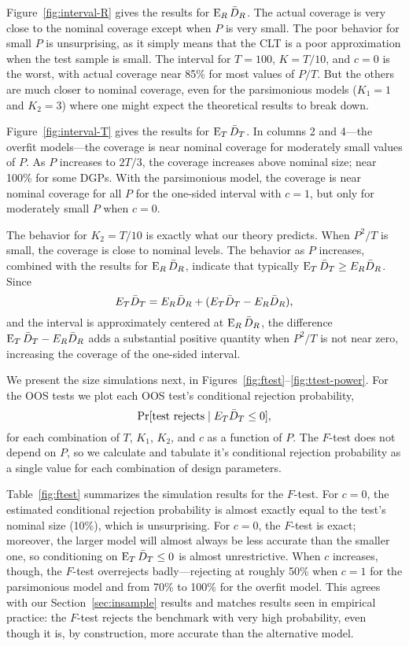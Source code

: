 \documentclass[12pt,draft]{article}
\begin{document}
Figure~\ref{fig:interval-R} gives the results for $\operatorname{E}_R \bar{D}_{R}$.  The
actual coverage is very close to the nominal coverage except when $P$
is very small.  The poor behavior for small $P$ is unsurprising, as it
simply means that the CLT is a poor approximation when the test sample
is small. The interval for $T = 100$, $K = T/10$, and $c = 0$ is the
worst, with actual coverage near 85\% for most values of $P/T$. But
the others are much closer to nominal coverage, even for the
parsimonious models ($K_1=1$ and $K_2= 3$) where one might expect
the theoretical results to break down.

Figure~\ref{fig:interval-T} gives the results for $\operatorname{E}_T \bar{D}_{T}$.  In
columns 2 and 4---the overfit models---the coverage is near nominal
coverage for moderately small values of $P$.  As $P$ increases to
$2T/3$, the coverage increases above nominal size; near 100\% for some
DGPs.  With the parsimonious model, the coverage is near nominal
coverage for all $P$ for the one-sided interval with $c=1$, but only
for moderately small $P$ when $c=0$.

The behavior for $K_2 = T/10$ is exactly what our theory predicts.
When $P^2/T$ is small, the coverage is close to nominal levels.  The
behavior as $P$ increases, combined with the results for $\operatorname{E}_R \bar{D}_{R}$,
indicate that typically $\operatorname{E}_T \bar{D}_{T} \geq E_R \bar{D}_{R}$.  Since
\begin{equation*}
  E_{T} \bar{D}_{T} = E_{R} \bar{D}_{R} + (E_{T} \bar{D}_{T} - E_{R} \bar{D}_{R}),
\end{equation*}
and the interval is approximately centered at $\operatorname{E}_R \bar{D}_{R}$, the
difference $\operatorname{E}_{T} \bar{D}_{T} - E_{R} \bar{D}_{R}$ adds a substantial positive
quantity when $P^2/T$ is not near zero, increasing the coverage of the
one-sided interval.

We present the size simulations next, in
Figures~\ref{fig:ftest}--\ref{fig:ttest-power}.  For the OOS tests
we plot each OOS test's conditional rejection probability,
\begin{equation*}
  \Pr[\text{test rejects} \mid E_T \bar{D}_{T} \leq 0],
\end{equation*}
for each combination of $T$, $K_1$, $K_2$, and $c$ as a function of
$P$.  The $F$-test does not depend on $P$, so we calculate and
tabulate it's conditional rejection probability as a single value for
each combination of design parameters.

Table~\ref{fig:ftest} summarizes the simulation results for the
$F$-test. For $c = 0$, the estimated conditional rejection probability
is almost exactly equal to the test's nominal size (10\%), which is
unsurprising.  For $c = 0$, the $F$-test is exact; moreover, the
larger model will almost always be less accurate than the smaller one,
so conditioning on $\operatorname{E}_T \bar{D}_{T} \leq 0$ is almost unrestrictive.  When
$c$ increases, though, the $F$-test overrejects badly---rejecting at
roughly 50\% when $c = 1$ for the parsimonious model and from 70\% to
100\% for the overfit model. This agrees with our
Section~\ref{sec:insample} results and matches results seen in
empirical practice: the $F$-test rejects the benchmark with very high
probability, even though it is, by construction, more accurate than
the alternative model.
\end{document}
